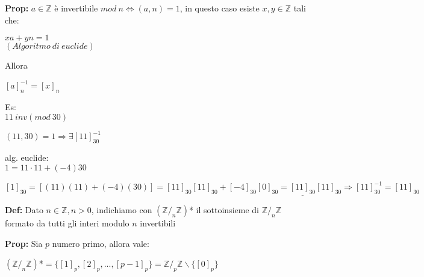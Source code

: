 \documentclass[11pt, letterpaper]{article}
\begin{document}
\textbf{Prop:} $a\in\mathbb{Z}$ è invertibile $mod\ n\Leftrightarrow(a,n)=1$, in questo caso esiste $x,y\in\mathbb{Z}$
tali che:
\begin{center}
    $xa+yn=1$\\
    $(Algoritmo\ di\ euclide)$
\end{center}
Allora
\begin{center}
    $[a]_{n}^{-1}=[x]_{n}$
\end{center}

Es:\\
$11\ inv(mod\ 30)$

$(11,30) = 1 \Rightarrow \exists[11]_{30}^{-1}$

alg. euclide:\\
$1= 11\cdot 11 + (-4)30$

$[1]_{30}=[(11)(11)+(-4)(30)]=[11]_{30}[11]_{30}+[-4]_{30}[0]_{30}=\underline{[11]_{30}}[11]_{30} \Rightarrow 
[11]_{30}^{-1}=[11]_{30}$

\textbf{Def:} Dato $n\in\mathbb{Z}, n>0$, indichiamo con $(\mathbb{Z}/_{n}\mathbb{Z})$* il sottoinsieme di 
$\mathbb{Z}/_{n}\mathbb{Z}$ formato da tutti gli interi modulo $n$ invertibili

\textbf{Prop:} Sia $p$ numero primo, allora vale:
\begin{center}
    $(\mathbb{Z}/_{n}\mathbb{Z})$*$=\{[1]_{p},[2]_{p},...,[p-1]_{p}\}=\mathbb{Z}/_{p}\mathbb{Z}\backslash \{[0]_{p}\}$
\end{center}
\end{document}
